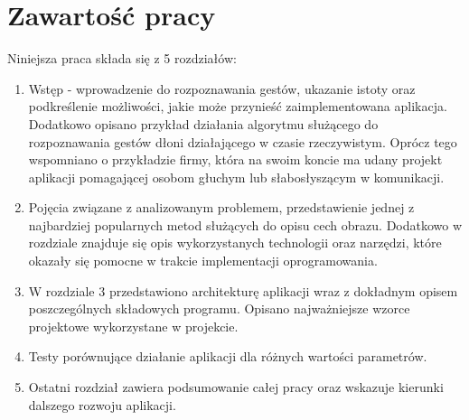 \section{Zawartość pracy}
\label{sec:zawartoscPracy}
Niniejsza praca składa się z 5 rozdziałów:
\begin{enumerate}
	\item Wstęp - wprowadzenie do rozpoznawania gestów, ukazanie istoty oraz podkreślenie możliwości, jakie może przynieść zaimplementowana aplikacja. Dodatkowo opisano przykład działania algorytmu służącego do rozpoznawania gestów dłoni działającego w czasie rzeczywistym. Oprócz tego wspomniano o przykładzie firmy, która na swoim koncie ma udany projekt aplikacji pomagającej osobom głuchym lub słabosłyszącym w komunikacji.
	\item Pojęcia związane z analizowanym problemem, przedstawienie jednej z najbardziej popularnych metod służących do opisu cech obrazu. Dodatkowo w rozdziale znajduje się opis wykorzystanych technologii oraz narzędzi, które okazały się pomocne w trakcie implementacji oprogramowania.
	\item W rozdziale 3 przedstawiono architekturę aplikacji wraz z dokładnym opisem poszczególnych składowych programu. Opisano najważniejsze wzorce projektowe wykorzystane w projekcie.
	\item Testy porównujące działanie aplikacji dla różnych wartości parametrów.
	\item Ostatni rozdział zawiera podsumowanie całej pracy oraz wskazuje kierunki dalszego rozwoju aplikacji. 
\end{enumerate}